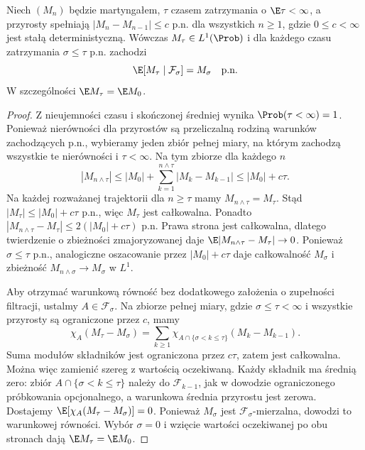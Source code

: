 \begin{twierdzenie}
Niech $(M_n)$ będzie martyngałem, $\tau$
czasem zatrzymania o $\E\tau<\infty$,
a przyrosty spełniają
$|M_n-M_{n-1}|\leq c$ p.n. dla wszystkich $n\geq1$,
gdzie $0\leq c<\infty$ jest stałą deterministyczną.
Wówczas $M_\tau\in L^1(\Prob)$ i dla każdego
czasu zatrzymania $\sigma\leq\tau$ p.n. zachodzi
\[
\E[M_\tau\mid\mathcal F_\sigma]=M_\sigma
\quad\text{p.n.}
\]
W szczególności $\E M_\tau=\E M_0$.
\end{twierdzenie}
\begin{proof}
Z nieujemności czasu i skończonej średniej
wynika $\Prob(\tau<\infty)=1$.
Ponieważ nierówności dla przyrostów są przeliczalną
rodziną warunków zachodzących p.n., wybieramy
jeden zbiór pełnej miary, na którym zachodzą
wszystkie te nierówności i $\tau<\infty$.
Na tym zbiorze dla każdego $n$
\[
|M_{n\wedge\tau}|
\leq|M_0|+\sum_{k=1}^{n\wedge\tau}|M_k-M_{k-1}|
\leq |M_0|+c\tau.
\]
Na każdej rozważanej trajektorii dla $n\geq\tau$
mamy $M_{n\wedge\tau}=M_\tau$. Stąd
$|M_\tau|\leq|M_0|+c\tau$ p.n., więc $M_\tau$
jest całkowalna. Ponadto
$|M_{n\wedge\tau}-M_\tau|\leq2(|M_0|+c\tau)$
p.n. Prawa strona jest całkowalna, dlatego
twierdzenie o zbieżności zmajoryzowanej daje
$\E|M_{n\wedge\tau}-M_\tau|\to0$.
Ponieważ $\sigma\leq\tau$ p.n., analogiczne
oszacowanie przez $|M_0|+c\tau$ daje całkowalność
$M_\sigma$ i zbieżność $M_{n\wedge\sigma}\to M_\sigma$
w $L^1$.

Aby otrzymać warunkową równość bez dodatkowego
założenia o zupełności filtracji, ustalmy
$A\in\mathcal F_\sigma$. Na zbiorze pełnej
miary, gdzie $\sigma\leq\tau<\infty$ i wszystkie
przyrosty są ograniczone przez $c$, mamy
\[
\chi_A(M_\tau-M_\sigma)
=\sum_{k\geq1}
 \chi_{A\cap\{\sigma<k\leq\tau\}}(M_k-M_{k-1}).
\]
Suma modułów składników jest ograniczona
przez $c\tau$, zatem jest całkowalna.
Można więc zamienić szereg z wartością
oczekiwaną. Każdy składnik ma średnią zero:
zbiór $A\cap\{\sigma<k\leq\tau\}$ należy do
$\mathcal F_{k-1}$, jak w dowodzie ograniczonego
próbkowania opcjonalnego, a warunkowa średnia
przyrostu jest zerowa. Dostajemy
$\E[\chi_A(M_\tau-M_\sigma)]=0$.
Ponieważ $M_\sigma$ jest $\mathcal F_\sigma$-mierzalna,
dowodzi to warunkowej równości.
Wybór $\sigma=0$ i wzięcie wartości oczekiwanej
po obu stronach dają $\E M_\tau=\E M_0$.
\end{proof}


